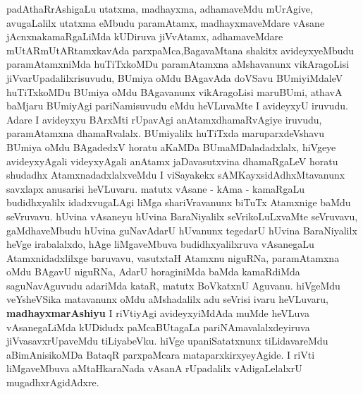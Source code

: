\begin{artha}
padAthaRrAshigaLu utatxma, madhayxma, adhamaveMdu mUrAgive,
avugaLalilx utatxma eMbudu paramAtamx, madhayxmaveMdare vAsane
jAcnxnakamaRgaLiMda kUDiruva jiVvAtamx, adhamaveMdare
mUtARmUtARtamxkavAda parxpaMca,\break BagavaMtana shakitx avideyxyeMbudu
paramAtamxniMda huTiTxkoMDu paramAtamxna aMshavanunx vikAragoLisi
jiVvarUpadalilxrisuvudu, BUmiya oMdu BAgavAda doVSavu BUmiyiMdaleV
huTiTxkoMDu BUmiya oMdu BAgavanunx vikAragoLisi maruBUmi, athavA
baMjaru BUmiyAgi pariNamisuvudu eMdu heVLuvaMte I  avideyxyU
iruvudu. Adare I avideyxyu BArxMti rUpavAgi anAtamxdhamaRvAgiye
iruvudu, paramAtamxna dhamaRvalalx. BUmiyalilx huTiTxda maruparxdeVshavu
BUmiya oMdu BAgadedxV horatu aKaMDa BUmaMDaladadxlalx, hiVgeye
avideyxyAgali videyxyAgali anAtamx jaDavasutxvina dhamaRgaLeV horatu
shudadhx AtamxnadadxlalxveMdu I viSayakekx sAMKayxsidAdhxMtavanunx
savxlapx anusarisi heVLuvaru. matutx vAsane - kAma - kamaRgaLu
budidhxyalilx idadxvugaLAgi liMga shariVravanunx biTuTx Atamxnige
baMdu seVruvavu. hUvina vAsaneyu hUvina BaraNiyalilx seVrikoLuLxvaMte
seVruvavu, gaMdhaveMbudu hUvina guNavAdarU hUvanunx tegedarU hUvina
BaraNiyalilx heVge irabalalxdo, hAge liMgaveMbuva budidhxyalilxruva
vAsanegaLu Atamxnidadxlilxge baruvavu, vasutxtaH Atamxnu niguRNa,
paramAtamxna oMdu BAgavU  niguRNa, AdarU horaginiMda baMda kamaRdiMda
saguNavAguvudu adariMda kataR, matutx BoVkatxnU Aguvanu. hiVgeMdu
veYsheVSika matavanunx oMdu aMshadalilx adu seVrisi ivaru heVLuvaru,
\textbf{madhayxmarAshiyu} I riVtiyAgi avideyxyiMdAda muMde heVLuva
vAsanegaLiMda kUDidudx paMcaBUtagaLa pariNAmavalalxdeyiruva
jiVvasavxrUpaveMdu tiLiyabeVku. hiVge upaniSatatxnunx tiLidavareMdu
aBimAnisikoMDa BataqR parxpaMcara mataparxkirxyeyAgide. I riVti
liMgaveMbuva aMtaHkaraNada vAsanA rUpadalilx vAdigaLelalxrU mugadhxrAgidAdxre.
\end{artha}

\centerline{}

